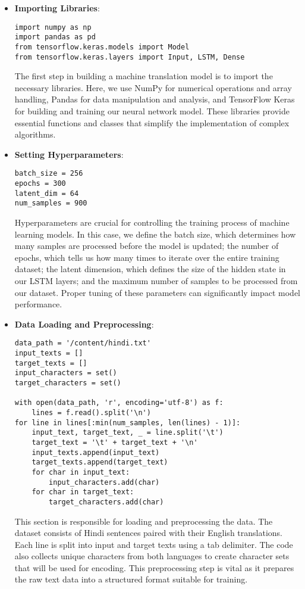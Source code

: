 \documentclass{article}
\begin{document}
\begin{itemize}
    \item \textbf{Importing Libraries}:
    \begin{verbatim}
import numpy as np 
import pandas as pd
from tensorflow.keras.models import Model
from tensorflow.keras.layers import Input, LSTM, Dense
    \end{verbatim}
    The first step in building a machine translation model is to import the necessary libraries. Here, we use NumPy for numerical operations and array handling, Pandas for data manipulation and analysis, and TensorFlow Keras for building and training our neural network model. These libraries provide essential functions and classes that simplify the implementation of complex algorithms.



    \item \textbf{Setting Hyperparameters}:
    \begin{verbatim}
batch_size = 256
epochs = 300
latent_dim = 64
num_samples = 900
    \end{verbatim}
    Hyperparameters are crucial for controlling the training process of machine learning models. In this case, we define the batch size, which determines how many samples are processed before the model is updated; the number of epochs, which tells us how many times to iterate over the entire training dataset; the latent dimension, which defines the size of the hidden state in our LSTM layers; and the maximum number of samples to be processed from our dataset. Proper tuning of these parameters can significantly impact model performance.



    \item \textbf{Data Loading and Preprocessing}:
    \begin{verbatim}
data_path = '/content/hindi.txt'
input_texts = []
target_texts = []
input_characters = set()
target_characters = set()

with open(data_path, 'r', encoding='utf-8') as f:
    lines = f.read().split('\n')
for line in lines[:min(num_samples, len(lines) - 1)]:
    input_text, target_text, _ = line.split('\t')
    target_text = '\t' + target_text + '\n'
    input_texts.append(input_text)
    target_texts.append(target_text)
    for char in input_text:
        input_characters.add(char)
    for char in target_text:
        target_characters.add(char)
    \end{verbatim}
    This section is responsible for loading and preprocessing the data. The dataset consists of Hindi sentences paired with their English translations. Each line is split into input and target texts using a tab delimiter. The code also collects unique characters from both languages to create character sets that will be used for encoding. This preprocessing step is vital as it prepares the raw text data into a structured format suitable for training.




\end{itemize}
\end{document}
